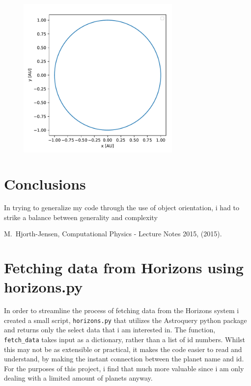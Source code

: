 \documentclass[10pt,showpacs,preprintnumbers,footinbib,amsmath,amssymb,aps,prl,twocolumn,groupedaddress,superscriptaddress,showkeys]{revtex4-1}
\begin{document}
\begin{figure}[h!tb]
  \center
  \includegraphics[width=8cm]{figs/exb_orbit_verlet.pdf}
\end{figure}



\section{Conclusions}
  In trying to generalize my code through the use of object orientation, i had to strike a balance between generality and complexity

\begin{thebibliography}{99}
 M.~Hjorth-Jensen, Computational Physics - Lecture Notes 2015, (2015).
\end{thebibliography}

\appendix
\section{Fetching data from Horizons using horizons.py}
  In order to streamline the process of fetching data from the Horizons system i created a small script, \lstinline{horizons.py} that utilizes the Astroquery python package and returns only the select data that i am interested in. The function, \lstinline{fetch_data} takes input as a dictionary, rather than a list of id numbers. Whilst this may not be as extensible or practical, it makes the code easier to read and understand, by making the instant connection between the planet name and id. For the purposes of this project, i find that much more valuable since i am only dealing with a limited amount of planets anyway.
\end{document}
